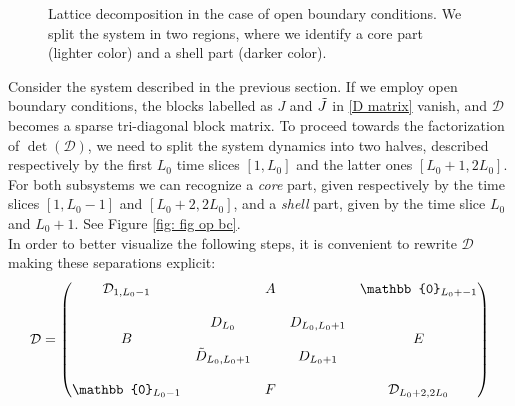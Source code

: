 \begin{figure}

    \caption{Lattice decomposition in the case of open boundary conditions. We split the system in two regions, where we identify a core part (lighter color) and a shell part (darker color).}
    \label{fig: fig op bc}
\end{figure}
Consider the system described in the previous section. If we employ open boundary conditions, the blocks labelled as $J$ and $\Tilde{J}$ in \eqref{D matrix} vanish, and $\mathcal{D}$ becomes a sparse tri-diagonal block matrix. To proceed towards the factorization of $\det (\mathcal{D})$, we need to split the system dynamics into two halves, described respectively by the first $L_0$ time slices $[1, L_0]$ and the latter ones $[L_0 + 1, 2L_0]$.
\\ For both subsystems we can recognize a \textit{core} part, given respectively by the time slices $[1, L_0 - 1]$ and $[L_0 + 2, 2L_0]$, and a \textit{shell} part, given by the time slice $L_0$ and $L_0 + 1$. See Figure \eqref{fig: fig op bc}.
\\ In order to better visualize the following steps, it is convenient to rewrite $\mathcal{D}$ making these separations explicit:
\begin{equation}
    \mathcal{D} = \begin{pmatrix}
         \mathcal{D}_{1, L_0 - 1} & & A & & \mathbb{0}_{L_0 +- 1} \\
         \\
          & D_{L_0} & & D_{L_0, L_0 + 1} &  \\
          B & & & & E \\
          &  \Tilde{D}_{L_0, L_0 + 1} & &  D_{L_0 + 1} & \\
          \\
         \mathbb{0}_{L_0 - 1} & & F & & \mathcal{D}_{L_0 + 2, 2L_0}
    \end{pmatrix}
\end{equation}
